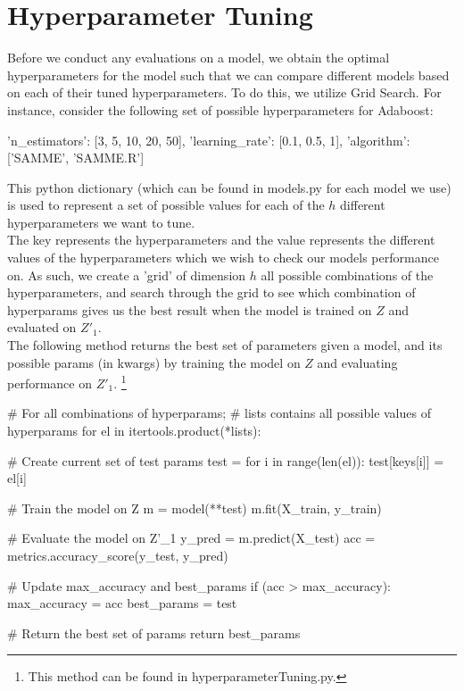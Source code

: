 \documentclass[fleqn]{article}
\begin{document}
    \noindent

    \section{Hyperparameter Tuning}
    Before we conduct any evaluations on a model, we obtain the optimal hyperparameters for
    the model such that we can compare different models based on each of their tuned
    hyperparameters. To do this, we utilize Grid Search. For instance, consider the following
    set of possible hyperparameters for Adaboost:
    \begin{python}
    {
        'n_estimators': [3, 5, 10, 20, 50],
        'learning_rate': [0.1, 0.5, 1],
        'algorithm': ['SAMME', 'SAMME.R']
    }
    \end{python}
    This python dictionary (which can be found in models.py for each model we use) is used
    to represent a set of possible values for each of the $ h $ different hyperparameters
    we want to tune. \\

    The key represents the hyperparameters and the value represents the
    different values of the hyperparameters which we wish to check our models performance
    on. As such, we create a 'grid' of dimension $ h $ all possible combinations of the
    hyperparameters, and search through the grid to see which combination of hyperparams
    gives us the best result when the model is trained on $ Z $ and evaluated on $ Z'_1 $.\\

    The following method returns the best set of parameters given a model, and its possible
    params (in kwargs) by training the model on $ Z $ and evaluating performance on $ Z'_1 $.
    \footnote{This method can be found in hyperparameterTuning.py.}
    \begin{python}
    # For all combinations of hyperparams;
    # lists contains all possible values of hyperparams
    for el in itertools.product(*lists):

        # Create current set of test params
        test = {}
        for i in range(len(el)):
            test[keys[i]] = el[i]

        # Train the model on Z
        m = model(**test)
        m.fit(X_train, y_train)

        # Evaluate the model on Z'_1
        y_pred = m.predict(X_test)
        acc = metrics.accuracy_score(y_test, y_pred)

        # Update max_accuracy and best_params
        if (acc > max_accuracy):
            max_accuracy = acc
            best_params = test

    # Return the best set of params
    return best_params
    \end{python}
\end{document}
